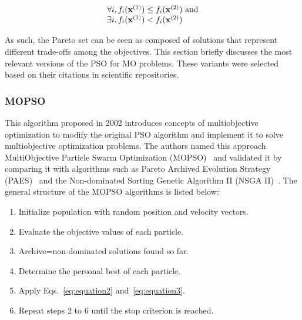 \begin{equation}
\begin{tabular}{l}
$\forall i, f_i(\mathbf{x}^{(1)}) \leq f_i(\mathbf{x}^{(2)})$  and  \\
$\exists i, f_i(\mathbf{x}^{(1)}) < f_i(\mathbf{x}^{(2)})$ \label{eq:dominance}
\end{tabular}
\end{equation}

As such, the Pareto set can be seen as composed of solutions that represent different trade-offs among the objectives. This section briefly discusses the most relevant versions of the PSO for MO problems. These variants were selected based on their citations in scientific repositories.

\subsubsection{MOPSO} 

This algorithm proposed in 2002 introduces concepts of multiobjective optimization to modify the original PSO algorithm and implement it to solve multiobjective optimization problems. The authors named this approach MultiObjective Particle Swarm Optimization (MOPSO)~\cite{coello2002mopso} and validated it by comparing it with algorithms such as Pareto Archived Evolution Strategy (PAES)~\cite{knowles1999pareto} and the Non-dominated Sorting Genetic Algorithm II (NSGA II)~\cite{deb2000fast}.
%
%
The general structure of the MOPSO algorithms is listed below:

\begin{enumerate}
    \item Initialize population with random position and velocity vectors.
    \item Evaluate the objective values of each particle. %
    \item Archive=non-dominated solutions found so far.
    \item Determine the personal best of each particle.
    \item Apply Eqs.~\ref{eq:equation2} and~\ref{eq:equation3}.
    \item Repeat steps 2 to 6 until the stop criterion is reached.
\end{enumerate}

